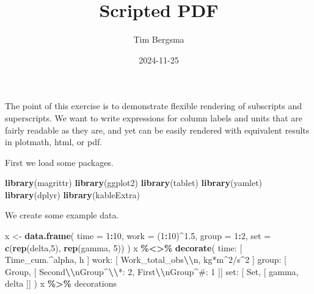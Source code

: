 \documentclass[
]{article}
\title{Scripted PDF}
\author{Tim Bergsma}
\date{2024-11-25}
\newenvironment{Shaded}{\begin{snugshade}}{\end{snugshade}}
\newcommand{\AttributeTok}[1]{\textcolor[rgb]{0.13,0.29,0.53}{#1}}
\newcommand{\DecValTok}[1]{\textcolor[rgb]{0.00,0.00,0.81}{#1}}
\newcommand{\FloatTok}[1]{\textcolor[rgb]{0.00,0.00,0.81}{#1}}
\newcommand{\FunctionTok}[1]{\textcolor[rgb]{0.13,0.29,0.53}{\textbf{#1}}}
\newcommand{\NormalTok}[1]{#1}
\newcommand{\OtherTok}[1]{\textcolor[rgb]{0.56,0.35,0.01}{#1}}
\newcommand{\SpecialCharTok}[1]{\textcolor[rgb]{0.81,0.36,0.00}{\textbf{#1}}}
\newcommand{\StringTok}[1]{\textcolor[rgb]{0.31,0.60,0.02}{#1}}
\begin{document}
\maketitle

The point of this exercise is to demonstrate flexible rendering of
subscripts and superscripts. We want to write expressions for column
labels and units that are fairly readable as they are, and yet can be
easily rendered with equivalent results in plotmath, html, or pdf.

First we load some packages.

\begin{Shaded}
\begin{Highlighting}[]
\FunctionTok{library}\NormalTok{(magrittr)}
\FunctionTok{library}\NormalTok{(ggplot2)}
\FunctionTok{library}\NormalTok{(tablet)}
\FunctionTok{library}\NormalTok{(yamlet)}
\FunctionTok{library}\NormalTok{(dplyr)}
\FunctionTok{library}\NormalTok{(kableExtra)}
\end{Highlighting}
\end{Shaded}

We create some example data.

\begin{Shaded}
\begin{Highlighting}[]
\NormalTok{x }\OtherTok{\textless{}{-}} \FunctionTok{data.frame}\NormalTok{(}
  \AttributeTok{time =} \DecValTok{1}\SpecialCharTok{:}\DecValTok{10}\NormalTok{, }
  \AttributeTok{work =}\NormalTok{ (}\DecValTok{1}\SpecialCharTok{:}\DecValTok{10}\NormalTok{)}\SpecialCharTok{\^{}}\FloatTok{1.5}\NormalTok{, }
  \AttributeTok{group =} \DecValTok{1}\SpecialCharTok{:}\DecValTok{2}\NormalTok{, }
  \AttributeTok{set =} \FunctionTok{c}\NormalTok{(}\FunctionTok{rep}\NormalTok{(}\StringTok{\textquotesingle{}delta\textquotesingle{}}\NormalTok{,}\DecValTok{5}\NormalTok{), }\FunctionTok{rep}\NormalTok{(}\StringTok{\textquotesingle{}gamma\textquotesingle{}}\NormalTok{, }\DecValTok{5}\NormalTok{))}
\NormalTok{)}
\NormalTok{x }\SpecialCharTok{\%\textless{}\textgreater{}\%} \FunctionTok{decorate}\NormalTok{(}\StringTok{\textquotesingle{}}
\StringTok{ time: [ Time\_cum.\^{}alpha, h ]}
\StringTok{ work: [ Work\_total\_obs}\SpecialCharTok{\textbackslash{}\textbackslash{}}\StringTok{n, kg*m\^{}2/s\^{}2 ]}
\StringTok{ group: [ Group, [ Second}\SpecialCharTok{\textbackslash{}\textbackslash{}}\StringTok{nGroup\^{}}\SpecialCharTok{\textbackslash{}\textbackslash{}}\StringTok{*: 2, First}\SpecialCharTok{\textbackslash{}\textbackslash{}}\StringTok{nGroup\^{}\#: 1 ]]}
\StringTok{ set: [ Set, [ gamma, delta ]]}
\StringTok{\textquotesingle{}}\NormalTok{)}
\NormalTok{x }\SpecialCharTok{\%\textgreater{}\%}\NormalTok{ decorations}
\end{Highlighting}
\end{Shaded}
\end{document}
